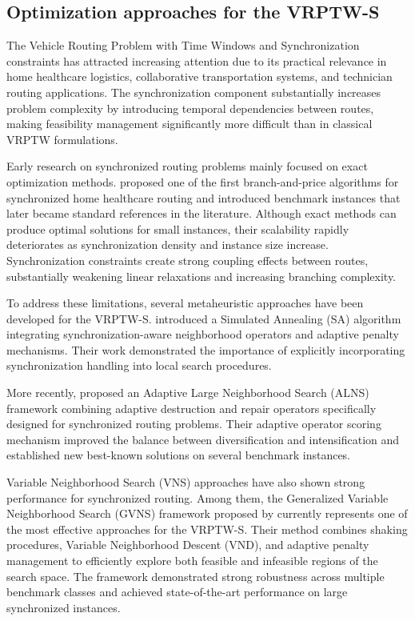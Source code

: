 \documentclass[preprint,12pt]{elsarticle}
\begin{document}
\subsection{Optimization approaches for the VRPTW-S}
\label{sec:approaches}

The Vehicle Routing Problem with Time Windows and Synchronization constraints has attracted increasing attention due to its practical relevance in home healthcare logistics, collaborative transportation systems, and technician routing applications. The synchronization component substantially increases problem complexity by introducing temporal dependencies between routes, making feasibility management significantly more difficult than in classical VRPTW formulations.

Early research on synchronized routing problems mainly focused on exact optimization methods. \citet{bredstrom2008combined} proposed one of the first branch-and-price algorithms for synchronized home healthcare routing and introduced benchmark instances that later became standard references in the literature. Although exact methods can produce optimal solutions for small instances, their scalability rapidly deteriorates as synchronization density and instance size increase. Synchronization constraints create strong coupling effects between routes, substantially weakening linear relaxations and increasing branching complexity.

To address these limitations, several metaheuristic approaches have been developed for the VRPTW-S. \citet{afifi2016heuristic} introduced a Simulated Annealing (SA) algorithm integrating synchronization-aware neighborhood operators and adaptive penalty mechanisms. Their work demonstrated the importance of explicitly incorporating synchronization handling into local search procedures.

More recently, \citet{liu2019adaptive} proposed an Adaptive Large Neighborhood Search (ALNS) framework combining adaptive destruction and repair operators specifically designed for synchronized routing problems. Their adaptive operator scoring mechanism improved the balance between diversification and intensification and established new best-known solutions on several benchmark instances.

Variable Neighborhood Search (VNS) approaches have also shown strong performance for synchronized routing. Among them, the Generalized Variable Neighborhood Search (GVNS) framework proposed by \citet{masmoudi2025generalized} currently represents one of the most effective approaches for the VRPTW-S. Their method combines shaking procedures, Variable Neighborhood Descent (VND), and adaptive penalty management to efficiently explore both feasible and infeasible regions of the search space. The framework demonstrated strong robustness across multiple benchmark classes and achieved state-of-the-art performance on large synchronized instances.
\end{document}
